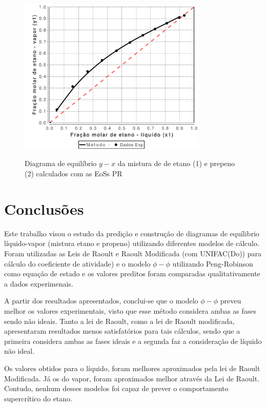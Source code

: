 \begin{figure}
\centering
{\includegraphics[width=0.8\textwidth]{img/VLE-Ethane(1)Propylene(2)-x1&y1-PengRobinson.pdf}}
\caption{Diagrama de equilíbrio $y-x$ da mistura de de etano (1) e
prepeno (2) calculados com as EoSs PR}
\label{fig:phi02}
\end{figure}
\clearpage

\section{Conclusões}

Este trabalho visou o estudo da predição e construção de diagramas de equílibrio
líquido-vapor (mistura etano e propeno) utilizando diferentes modelos de
cálculo. Foram utilizadas as Leis de Raoult e Raoult Modificada (com UNIFAC(Do))
para cálculo do coeficiente de atividade) e o modelo $\phi-\phi$ utilizando Peng-Robinson como equação de
estado e os valores preditos foram comparadas qualitativamente a dados
experimenais.

A partir dos resultados apresentados, conclui-se que o modelo $\phi-\phi$
preveu melhor os valores experimentais, visto que esse método considera ambas as
fases sendo não ideais. Tanto a lei de Raoult, como a lei de Raoult modificada,
apresentaram resultados menos satisfatórios para tais cálculos, sendo que a
primeira considera ambas as fases ideais e a segunda faz a consideração de
líquido não ideal. 

Os valores obtidos para o líquido, foram melhores aproximados pela lei de
Raoult Modificada. Já os do vapor, foram aproximados melhor através da Lei de Raoult.
Contudo, nenhum desses modelos foi capaz de prever o
comportamento supercrítico do etano.


